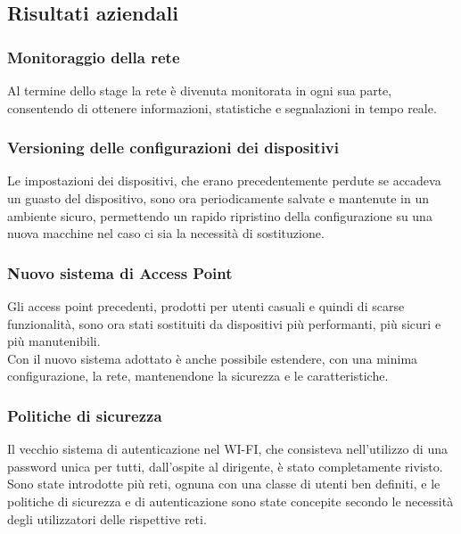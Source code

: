 \documentclass[Tesi.tex]{subfiles}
\begin{document}
\subsection{Risultati aziendali}
\subsubsection{Monitoraggio della rete}
Al termine dello stage la rete è divenuta monitorata in ogni sua parte, consentendo di ottenere informazioni, statistiche e segnalazioni in tempo reale.

\subsubsection{Versioning delle configurazioni dei dispositivi}
Le impostazioni dei dispositivi, che erano precedentemente perdute se accadeva un guasto del dispositivo, sono ora periodicamente salvate e mantenute in un ambiente sicuro, permettendo un rapido ripristino della configurazione su una nuova macchine nel caso ci sia la necessità di sostituzione.

\subsubsection{Nuovo sistema di Access Point}
Gli access point precedenti, prodotti per utenti casuali e quindi di scarse funzionalità, sono ora stati sostituiti da dispositivi più performanti, più sicuri e più manutenibili. \\
Con il nuovo sistema adottato è anche possibile estendere, con una minima configurazione, la rete, mantenendone la sicurezza e le caratteristiche.

\subsubsection{Politiche di sicurezza}
Il vecchio sistema di autenticazione nel WI-FI, che consisteva nell'utilizzo di una password unica per tutti, dall'ospite al dirigente, è stato completamente rivisto. \\
Sono state introdotte più reti, ognuna con una classe di utenti ben definiti, e le politiche di sicurezza e di autenticazione sono state concepite secondo le necessità degli utilizzatori delle rispettive reti.
\end{document}
